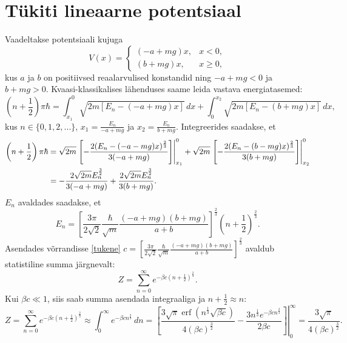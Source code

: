 \documentclass{trkut}%
\DeclareMathOperator{\erf}{erf}
\begin{document}
\section{Tükiti lineaarne potentsiaal}
Vaadeltakse potentsiaali kujuga
\begin{equation}
    V(x)=\begin{cases}
        (-a+mg)x, & x<0,\\
        (b+mg)x, & x\ge0,
    \end{cases}
\end{equation}
kus $a$ ja $b$ on positiivsed reaalarvulised konstandid ning $-a+mg<0$ ja $b+mg>0$.
Kvaasi-klassikalises lähenduses saame leida vastava energiatasemed:
\begin{equation}
    \left( n+\frac{1}{2}\right)\pi \hbar = \int_{x_1}^{0} \sqrt{2m[E_n-(-a+mg)x]}\, dx + \int_{0}^{x_2} \sqrt{2m[E_n-(b+mg)x]} \, dx,
\end{equation}
kus \(n \in \{0, 1, 2, ...\}\), \(x_1=\frac{E_n}{-a+mg}\) ja \(x_2=\frac{E_n}{b+mg}\). Integreerides saadakse, et
\begin{align}
    \left(n+\frac{1}{2}\right)\pi \hbar &= \sqrt{2m}\left.\left[-\frac{2(E_n-(-a-mg)x)^\frac{2}{3}}{3(-a+mg)}\right]\right|^0_{x_1} + \sqrt{2m}\left.\left[-\frac{2(E_n-(b-mg)x)^\frac{2}{3}}{3(b+mg)}\right]\right|^{0}_{x_2} \notag \\
    &= -\frac{2\sqrt{2m}E_n^{\frac{3}{2}}}{3(-a+mg)}+\frac{2\sqrt{2m}E_n^{\frac{3}{2}}}{3(b+mg)}.
\end{align}
$E_n$ avaldades saadakse, et
\begin{equation}
    E_n =\left[\frac{3\pi}{2\sqrt{2}} \frac{\hbar}{\sqrt{m}} \frac{(-a+mg)(b+mg)}{a+b}\right]^{\frac{2}{3}} \left(n+\frac{1}{2}\right)^{\frac{2}{3}} . \label{tukene}
\end{equation}
Asendades võrrandisse \eqref{tukene} $c=\left[\frac{3\pi}{2\sqrt{2}} \frac{\hbar}{\sqrt{m}} \frac{(-a+mg)(b+mg)}{a+b}\right]^{\frac{2}{3}}$ avaldub statistiline summa järgnevalt:
\begin{equation}
    Z=\sum_{n=0}^{\infty} e^{-\beta c \left(n+\frac{1}{2}\right)^\frac{2}{3}}.
\end{equation}
Kui $\beta c\ll 1$, siis saab summa asendada integraaliga ja $n+\frac{1}{2}\approx n$:
\begin{equation}
    Z=\sum_{n=0}^{\infty} e^{-\beta c \left(n+\frac{1}{2}\right)^\frac{2}{3}} \approx \int_0^\infty e^{-\beta c n^\frac{2}{3}} \, dn = \left.\left[ \frac{3\sqrt{\pi}  \erf{\left( {n}^\frac{1}{3} \sqrt{\beta c}\right)} }{4 (\beta c)^\frac{3}{2}}-\frac{3n^\frac{1}{3} e^{-\beta cn^\frac{2}{3}}}{2 \beta c }\right]\right|^{\infty}_{0}=\frac{3\sqrt{\pi}}{4(\beta c)^\frac{3}{2}} .
\end{equation}
\end{document}
